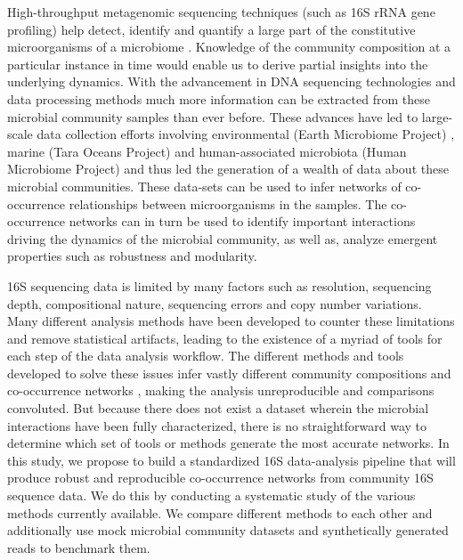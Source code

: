   High-throughput metagenomic sequencing techniques (such as 16S rRNA gene profiling) help detect, identify and quantify a large part of the constitutive microorganisms of a microbiome \cite{Jovel2016}.
  Knowledge of the community composition at a particular instance in time would enable us to derive partial insights into the underlying dynamics.
  With the advancement in DNA sequencing technologies \cite{Narihiro2017} and data processing methods much more information can be extracted from these microbial community samples than ever before.
  These advances have led to large-scale data collection efforts involving environmental (Earth Microbiome Project) \cite{Thompson2017}, marine (Tara Oceans Project) \cite{Zhang2015} and human-associated microbiota (Human Microbiome Project) \cite{HumanMicrobiomeProjectConsortium2012} and thus led the generation of a wealth of data about these microbial communities.
  These data-sets can be used to infer networks of co-occurrence relationships between microorganisms in the samples.
  The co-occurrence networks can in turn be used to identify important interactions driving the dynamics of the microbial community, as well as, analyze emergent properties such as robustness and modularity.

  16S sequencing data is limited by many factors such as resolution, sequencing depth, compositional nature, sequencing errors and copy number variations.
  Many different analysis methods have been developed \cite{Callahan2016,Amir2017,Friedman2012,Kurtz2015} to counter these limitations and remove statistical artifacts, leading to the existence of a myriad of tools for each step of the data analysis workflow.
  The different methods and tools developed to solve these issues infer vastly different community compositions and co-occurrence networks \cite{Golob2017,Weiss2016}, making the analysis unreproducible and comparisons convoluted.
  But because there does not exist a dataset wherein the microbial interactions have been fully characterized, there is no straightforward way to determine which set of tools or methods generate the most accurate networks.
  In this study, we propose to build a standardized 16S data-analysis pipeline that will produce robust and reproducible co-occurrence networks from community 16S sequence data.
  We do this by conducting a systematic study of the various methods currently available.
  We compare different methods to each other and additionally use mock microbial community datasets and synthetically generated reads to benchmark them.

